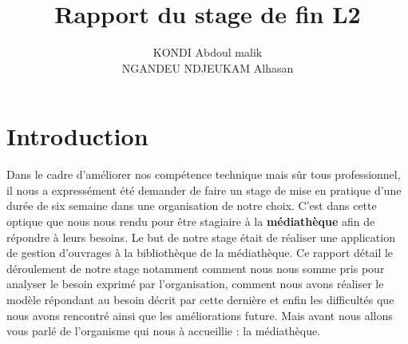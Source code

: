 \documentclass[12pt,a4paper]{article}
\author{KONDI Abdoul malik \\ NGANDEU NDJEUKAM Alhasan}
\title{Rapport du stage de fin L2}
\begin{document}
\maketitle
\tableofcontents
\newpage

\section{Introduction}
Dans le cadre d'améliorer nos compétence technique mais sûr tous professionnel, il nous a expressément été demander
de faire un stage de mise en pratique d'une durée de six semaine dans une organisation de notre choix. C'est dans cette optique que nous nous rendu pour être stagiaire à la \textbf{médiathèque} afin de répondre à leurs besoins.
Le but de notre stage était de réaliser une application de gestion d'ouvrages à la  bibliothèque de la médiathèque.
Ce rapport détail le déroulement de notre stage notamment comment nous nous somme
pris pour analyser le besoin exprimé par l'organisation, comment nous avons réaliser le modèle répondant au besoin décrit par cette dernière et enfin les 
difficultés que nous avons rencontré ainsi que les améliorations future. Mais avant nous allons vous
parlé de l'organisme qui nous à accueillie : la médiathèque.
\end{document}
